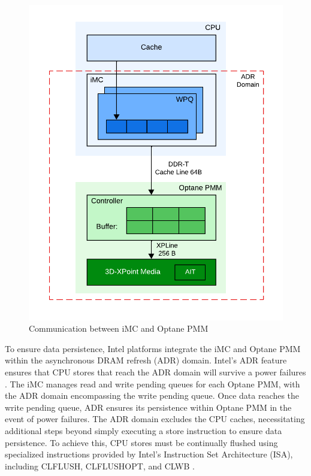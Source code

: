 \begin{figure}[ht]
    \centering
    \includegraphics[scale=0.7]{images/optane-communication.png}
    \caption{Communication between iMC and Optane PMM}
    \label{fig:optane_communication}
\end{figure}

To ensure data persistence, Intel platforms integrate the iMC and Optane PMM within the asynchronous DRAM refresh (ADR) domain. Intel's ADR feature ensures that CPU stores that reach the ADR domain will survive a power failures \cite{yang2020empirical}. The iMC manages read and write pending queues for each Optane PMM, with the ADR domain encompassing the write pending queue. Once data reaches the write pending queue, ADR ensures its persistence within Optane PMM in the event of power failures. The ADR domain excludes the CPU caches, necessitating additional steps beyond simply executing a store instruction to ensure data persistence. To achieve this, CPU stores must be continually flushed using specialized instructions provided by Intel's Instruction Set Architecture (ISA), including \textrm{CLFLUSH}, \textrm{CLFLUSHOPT}, and \textrm{CLWB} \cite{yang2020empirical,izraelevitz2019basic,rudoff2017persistent}.

